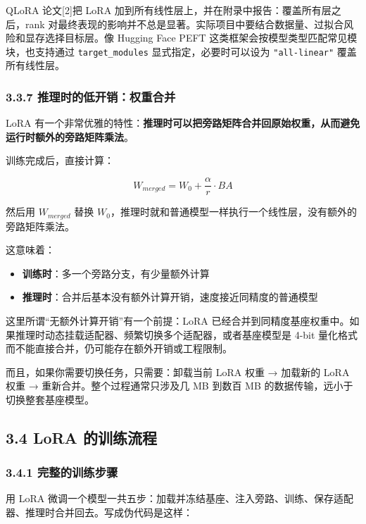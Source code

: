 \documentclass[
  chinese,
]{ctexart}
\providecommand{\tightlist}{%
  \setlength{\itemsep}{0pt}\setlength{\parskip}{0pt}}
\begin{document}
QLoRA 论文{[}2{]}把 LoRA
加到所有线性层上，并在附录中报告：覆盖所有层之后，rank
对最终表现的影响并不总是显著。实际项目中要结合数据量、过拟合风险和显存选择目标层。像
Hugging Face PEFT 这类框架会按模型类型匹配常见模块，也支持通过
\texttt{target\_modules} 显式指定，必要时可以设为 \texttt{"all-linear"}
覆盖所有线性层。

\subsubsection{3.3.7
推理时的低开销：权重合并}\label{ux63a8ux7406ux65f6ux7684ux4f4eux5f00ux9500ux6743ux91cdux5408ux5e76}

LoRA
有一个非常优雅的特性：\textbf{推理时可以把旁路矩阵合并回原始权重，从而避免运行时额外的旁路矩阵乘法}。

训练完成后，直接计算：

\[W_{merged} = W_0 + \frac{\alpha}{r} \cdot BA\]

然后用 \(W_{merged}\) 替换
\(W_0\)，推理时就和普通模型一样执行一个线性层，没有额外的旁路矩阵乘法。

这意味着：

\begin{itemize}
\tightlist
\item
  \textbf{训练时}：多一个旁路分支，有少量额外计算
\item
  \textbf{推理时}：合并后基本没有额外计算开销，速度接近同精度的普通模型
\end{itemize}

这里所谓``无额外计算开销''有一个前提：LoRA
已经合并到同精度基座权重中。如果推理时动态挂载适配器、频繁切换多个适配器，或者基座模型是
4-bit 量化格式而不能直接合并，仍可能存在额外开销或工程限制。

而且，如果你需要切换任务，只需要：卸载当前 LoRA 权重 → 加载新的 LoRA
权重 → 重新合并。整个过程通常只涉及几 MB 到数百 MB
的数据传输，远小于切换整套基座模型。

\subsection{3.4 LoRA
的训练流程}\label{lora-ux7684ux8badux7ec3ux6d41ux7a0b}

\subsubsection{3.4.1
完整的训练步骤}\label{ux5b8cux6574ux7684ux8badux7ec3ux6b65ux9aa4}

用 LoRA
微调一个模型一共五步：加载并冻结基座、注入旁路、训练、保存适配器、推理时合并回去。写成伪代码是这样：
\end{document}
